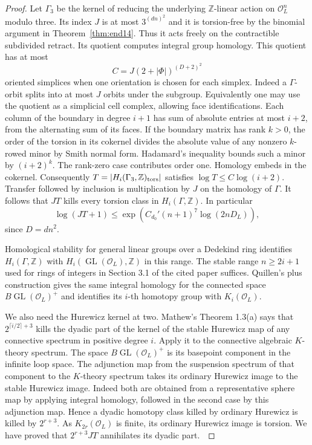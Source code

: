 \documentclass[a4paper,11pt]{article}
\theoremstyle{definition}
\theoremstyle{remark}
\newcommand{\ZZ}{\mathbb Z}\newcommand{\ord}{\operatorname{ord}}
\numberwithin{equation}{section}
\begin{document}
\begin{proof}
Let \(\Gamma_3\) be the kernel of reducing the underlying \(\ZZ\)-linear action on \(\mathcal O_L^n\) modulo three. Its index \(J\) is at most \(3^{(dn)^2}\) and it is torsion-free by the binomial argument in Theorem~\ref{thm:end14}. Thus it acts freely on the contractible subdivided retract. Its quotient computes integral group homology. This quotient has at most
\[
                  C=J(2+|\Phi|)^{(D+2)^2}
\]
oriented simplices when one orientation is chosen for each simplex. Indeed a \(\Gamma\)-orbit splits into at most \(J\) orbits under the subgroup. Equivalently one may use the quotient as a simplicial cell complex, allowing face identifications. Each column of the boundary in degree \(i+1\) has sum of absolute entries at most \(i+2\), from the alternating sum of its faces. If the boundary matrix has rank \(k>0\), the order of the torsion in its cokernel divides the absolute value of any nonzero \(k\)-rowed minor by Smith normal form. Hadamard's inequality bounds such a minor by \((i+2)^k\). The rank-zero case contributes order one. Homology embeds in the cokernel. Consequently \(T=|H_i(\Gamma_3,\ZZ)_{\rm tors}|\) satisfies \(\log T\le C\log(i+2)\). Transfer followed by inclusion is multiplication by \(J\) on the homology of \(\Gamma\). It follows that \(JT\) kills every torsion class in \(H_i(\Gamma,\ZZ)\). In particular
\[
       \log(JT+1)
             \le \exp\!\left(C_{d_0}'(n+1)^7\log(2nD_L)\right),
\]
since \(D=dn^2\).

Homological stability for general linear groups over a Dedekind ring identifies \(H_i(\Gamma,\ZZ)\) with \(H_i(\operatorname{GL}(\mathcal O_L),\ZZ)\) in this range. The stable range \(n\ge2i+1\) used for rings of integers in Section 3.1 of the cited paper suffices. Quillen's plus construction gives the same integral homology for the connected space \(B\operatorname{GL}(\mathcal O_L)^+\) and identifies its \(i\)-th homotopy group with \(K_i(\mathcal O_L)\).~\cite[Sec.~3.1]{II-II-II-beh17}\cite{II-II-II-weibel15}

We also need the Hurewicz kernel at two. Mathew's Theorem 1.3(a) says that \(2^{\lceil i/2\rceil+3}\) kills the dyadic part of the kernel of the stable Hurewicz map of any connective spectrum in positive degree \(i\). Apply it to the connective algebraic \(K\)-theory spectrum. The space \(B\operatorname{GL}(\mathcal O_L)^+\) is its basepoint component in the infinite loop space. The adjunction map from the suspension spectrum of that component to the \(K\)-theory spectrum takes its ordinary Hurewicz image to the stable Hurewicz image. Indeed both are obtained from a representative sphere map by applying integral homology, followed in the second case by this adjunction map. Hence a dyadic homotopy class killed by ordinary Hurewicz is killed by \(2^{r+3}\). As \(K_{2r}(\mathcal O_L)\) is finite, its ordinary Hurewicz image is torsion. We have proved that \(2^{r+3}JT\) annihilates its dyadic part.~\cite[Thm.~1.3(a)]{II-II-II-mathew17}


\end{proof}
\end{document}
